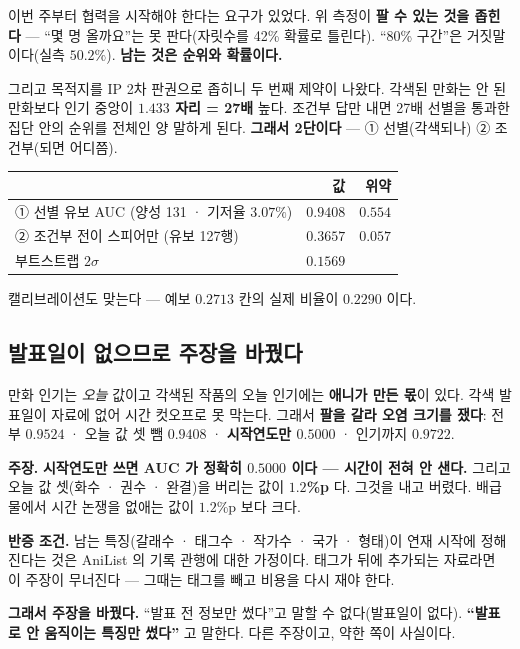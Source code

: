 \documentclass[10pt,a4paper]{article}
\newcommand{\claim}[2]{\begin{claimbox}\textbf{주장.} #1\par\smallskip
  \textcolor{gray!70}{\textbf{반증 조건.} #2}\end{claimbox}}
\begin{document}
이번 주부터 협력을 시작해야 한다는 요구가 있었다. 위 측정이 \textbf{팔 수 있는
것을 좁힌다} --- ``몇 명 올까요''는 못 판다(자릿수를 42\% 확률로 틀린다).
``80\% 구간''은 거짓말이다(실측 $50.2\%$). \textbf{남는 것은 순위와 확률이다.}

그리고 목적지를 IP 2차 판권으로 좁히니 두 번째 제약이 나왔다. 각색된 만화는 안 된
만화보다 인기 중앙이 \textbf{$1.433$ 자리 = 27배} 높다. 조건부 답만 내면 27배
선별을 통과한 집단 안의 순위를 전체인 양 말하게 된다. \textbf{그래서 2단이다} ---
① 선별(각색되나) ② 조건부(되면 어디쯤).

\begin{center}
\begin{tabular}{lrr}
\toprule
 & 값 & 위약 \\
\midrule
① 선별 유보 AUC (양성 131 · 기저율 $3.07\%$) & $\mathbf{0.9408}$ & $0.554$ \\
② 조건부 전이 스피어만 (유보 127행) & $\mathbf{0.3657}$ & $0.057$ \\
\quad 부트스트랩 $2\sigma$ & $0.1569$ & \\
\bottomrule
\end{tabular}
\end{center}

캘리브레이션도 맞는다 --- 예보 $0.2713$ 칸의 실제 비율이 $0.2290$ 이다.

\subsection*{발표일이 없으므로 주장을 바꿨다}

만화 인기는 \emph{오늘} 값이고 각색된 작품의 오늘 인기에는 \textbf{애니가 만든
몫}이 있다. 각색 발표일이 자료에 없어 시간 컷오프로 못 막는다. 그래서 \textbf{팔을
갈라 오염 크기를 쟀다}: 전부 $0.9524$ · 오늘 값 셋 뺌 $\mathbf{0.9408}$ ·
\textbf{시작연도만 $0.5000$} · 인기까지 $0.9722$.

\claim{\textbf{시작연도만 쓰면 AUC 가 정확히 $0.5000$ 이다 --- 시간이 전혀 안
샌다.} 그리고 오늘 값 셋(화수 · 권수 · 완결)을 버리는 값이 \textbf{$1.2$\%p} 다.
그것을 내고 버렸다. 배급물에서 시간 논쟁을 없애는 값이 $1.2$\%p 보다 크다.}
{남는 특징(갈래수 · 태그수 · 작가수 · 국가 · 형태)이 연재 시작에 정해진다는 것은
AniList 의 기록 관행에 대한 가정이다. 태그가 뒤에 추가되는 자료라면 이 주장이
무너진다 --- 그때는 태그를 빼고 비용을 다시 재야 한다.}

\textbf{그래서 주장을 바꿨다.} ``발표 전 정보만 썼다''고 말할 수 없다(발표일이
없다). \textbf{``발표로 안 움직이는 특징만 썼다''} 고 말한다. 다른 주장이고, 약한
쪽이 사실이다.
\end{document}
